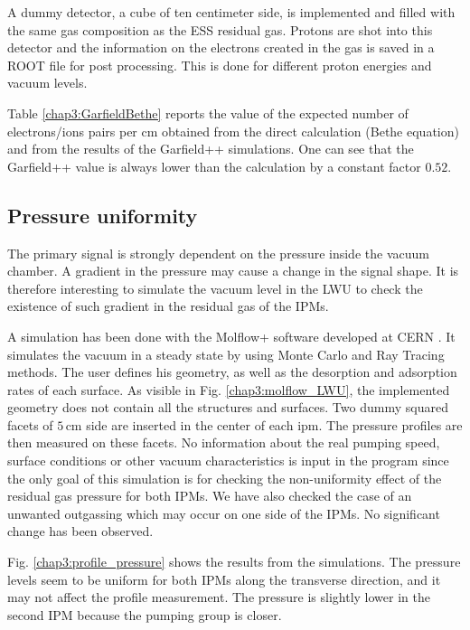 \begin{refsection}
  
  A dummy detector, a cube of ten centimeter side, is implemented and filled with the same gas composition as the ESS residual gas. Protons are shot into this detector and the information on the electrons created in the gas is saved in a ROOT file \cite{Brun1997,Antcheva2009} for post processing. This is done for different proton energies and vacuum levels.

  Table \ref{chap3:GarfieldBethe} reports the value of the expected number of electrons/ions pairs per cm obtained from the direct calculation (Bethe equation) and from the results of the Garfield++ simulations. One can see that the Garfield++ value is always lower than the calculation by a constant factor $0.52$.


  \subsection{Pressure uniformity}

  The primary signal is strongly dependent on the pressure inside the vacuum chamber. A gradient in the pressure may cause a change in the signal shape. It is therefore interesting to simulate the vacuum level in the LWU to check the existence of such gradient in the residual gas of the IPMs.

  

  A simulation has been done with the Molflow+ software developed at CERN \cite{Kersevan2009}. It simulates the vacuum in a steady state by using Monte Carlo and Ray Tracing methods. The user defines his geometry, as well as the desorption and adsorption rates of each surface. As visible in Fig. \ref{chap3:molflow_LWU}, the implemented geometry does not contain all the structures and surfaces. Two dummy squared facets of $5\,\mathrm{cm}$ side are inserted in the center of each \acrshort{ipm}. The pressure profiles are then measured on these facets. No information about the real pumping speed, surface conditions or other vacuum characteristics is input in the program since the only goal of this simulation is for checking the non-uniformity effect of the residual gas pressure for both IPMs. We have also checked the case of an unwanted outgassing which may occur on one side of the IPMs. No significant change has been observed.

  

  Fig. \ref{chap3:profile_pressure} shows the results from the simulations. The pressure levels seem to be uniform for both IPMs along the transverse direction, and it may not affect the profile measurement. The pressure is slightly lower in the second IPM because the pumping group is closer.


\end{refsection}
